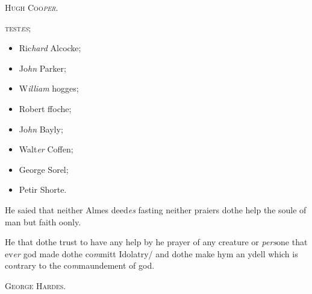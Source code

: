 \documentclass[12pt, a4paper]{book}
\begin{document}
			

 

            
            
            	
				\begin{center} \begin{large} {\scshape Hugh Coo\textit{per}.} \end{large} \end{center}
			

 
 	
 	\begin{center} {\scshape test\textit{es};} \end{center}\begin{itemize}
 		
 		\item[]Ric\textit{hard} Alcocke;
 		\item[]Jo\textit{hn} Parker;
 		\item[]W\textit{illiam} hogges;
 		\item[]Robert ffoche;
 		\item[]Jo\textit{hn} Bayly;
 		\item[]Walt\textit{er} Coffen;
 		\item[]George Sorel;
 		\item[]Petir Shorte.
 	\end{itemize}
			 
		\ifthenelse{\isodd{\thepage}}
		{\reversemarginpar}
		{\normalmarginpar}
		He saied that neither Almes deed\textit{es} fasting neither
 praiers dothe help the soule of man but faith oonly.
 
		\ifthenelse{\isodd{\thepage}}
		{\reversemarginpar}
		{\normalmarginpar}
		He that dothe trust to have any help by he prayer
 of any creature or \textit{pers}one that ev\textit{er} god made
 dothe co\textit{m}mitt Idolatry/ and dothe make hym an
 ydell which is co\textit{n}trary to the co\textit{m}maundement of god.
 

            
            	
				\begin{center} \begin{large} {\scshape George Hardes.} \end{large} \end{center}
			
\end{document}
